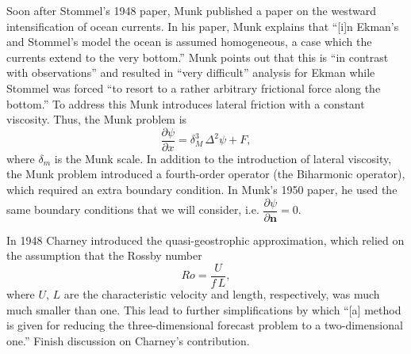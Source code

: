 Soon after Stommel's 1948 paper, Munk\cite{Munk1950} published a paper on the
westward intensification of ocean currents. In his paper, Munk explains that
``[i]n Ekman's and Stommel's model the ocean is assumed homogeneous, a case
which the currents extend to the very bottom.'' Munk points out that this is
``in contrast with observations'' and resulted in ``very difficult'' analysis
for Ekman while Stommel was forced ``to resort to a rather arbitrary frictional
force along the bottom.'' To address this Munk introduces lateral friction with
a constant viscosity. Thus, the Munk problem is
\cite{Fox-Kemper2003,Munk1950,Vallis06}
\begin{equation}
  \frac{\partial \psi}{\partial x} = \delta_M^3\, \Delta^2 \psi + F,
  \label{eqn:MunkProblem}
\end{equation}
where $\delta_m$ is the Munk scale. In addition to the introduction of lateral
viscosity, the Munk problem introduced a fourth-order operator (the Biharmonic
operator), which required an extra boundary condition.  In Munk's 1950
paper\cite{Munk1950}, he used the same boundary conditions that we will
consider, i.e. $\dfrac{\partial \psi}{\partial \mathbf{n}} = 0$.

In 1948 Charney\cite{Charney1948} introduced the quasi-geostrophic
approximation, which relied on the assumption that the Rossby number
\begin{equation}
  Ro = \frac{U}{f\, L},
  \label{eqn:RossbyNumber}
\end{equation}
where $U,\, L$ are the characteristic velocity and length, respectively, was
much much smaller than one. This lead to further simplifications by which ``[a]
method is given for reducing the three-dimensional forecast problem to a
two-dimensional one.'' \cite{Charney1949}
{\color{red} Finish discussion on Charney's contribution.}
